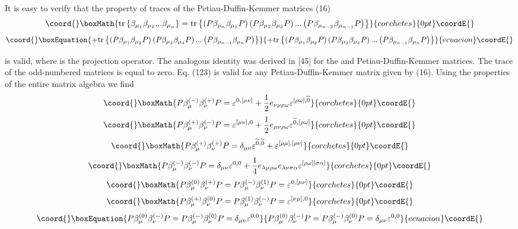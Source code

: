 \documentclass[a4paper,12pt]{article}
\begin{document}
It is easy to verify that the property of traces of the \coordHE{}
Petiau-Duffin-Kemmer matrices \myHighlight{$\beta _\mu ^{(\pm )}$}\coordHE{} (16)
\[\coord{}\boxMath{
\mbox{tr}\left\{ \beta _{\mu _1}\beta _{\mu _2}...\beta _{\mu
_n}\right\} = \mbox{tr}\left\{ \left( P\beta _{\mu _n}\beta _{\mu
_1}P\right) \left( P\beta _{\mu _2}\beta _{\mu _3}P\right)
...\left( P\beta _{\mu _{n-2}}\beta _{\mu _{n-1}}P\right) \right\}
}{corchetes}{0pt}\coordE{}\]
\begin{equation}\coord{}\boxEquation{
+\mbox{tr}\left\{ \left( P\beta _{\mu _1}\beta _{\mu _2}P\right)
\left( P\beta _{\mu _3}\beta _{\mu _4}P\right) ...\left( P\beta
_{\mu _{n-1}}\beta _{\mu _n}P\right) \right\}  \label{123}
}{
+\mbox{tr}\left\{ \left( P\beta _{\mu _1}\beta _{\mu _2}P\right)
\left( P\beta _{\mu _3}\beta _{\mu _4}P\right) ...\left( P\beta
_{\mu _{n-1}}\beta _{\mu _n}P\right) \right\}  }{ecuacion}\coordE{}\end{equation}

is valid, where \coordHE{} is the projection operator. The analogous identity was
derived in [45] for the \coordHE{} and \coordHE{}Petiau-Duffin-Kemmer matrices. The trace of the odd-numbered
matrices \myHighlight{$\beta _\mu ^{(\pm )}$}\coordHE{} is equal to zero. Eq. (123) is
valid for any Petiau-Duffin-Kemmer matrix given by (16). Using the
properties of the entire matrix algebra \coordHE{} we
find
\[\coord{}\boxMath{
P\beta _\mu ^{(-)}\beta _\nu ^{(+)}P=\varepsilon ^{0,[\mu \nu ]}+\frac
12e_{\nu \mu \rho \omega }\varepsilon ^{[\rho \omega ],\widetilde{0}}
}{corchetes}{0pt}\coordE{}\]
\[\coord{}\boxMath{
P\beta _\mu ^{(+)}\beta _\nu ^{(-)}P=\varepsilon ^{[\mu \nu ],0}+\frac
12e_{\mu \nu \rho \omega }\varepsilon ^{\widetilde{0},[\rho \omega ]}
}{corchetes}{0pt}\coordE{}\]
\[\coord{}\boxMath{
P\beta _\mu ^{(+)}\beta _\nu ^{(+)}P=\delta _{\mu \nu }\varepsilon
^{ \widetilde{0},\widetilde{0}}+\varepsilon ^{[\rho \mu ],[\rho
\nu ]}
}{corchetes}{0pt}\coordE{}\]
\[\coord{}\boxMath{
P\beta _\mu ^{(-)}\beta _\nu ^{(-)}P=\delta _{\mu \nu }\varepsilon
^{0,0}+\frac 14e_{\lambda \mu \rho \omega }e_{\lambda \nu \sigma \alpha
}\varepsilon ^{[\rho \omega ][\sigma \alpha ]}
}{corchetes}{0pt}\coordE{}\]
\[\coord{}\boxMath{
P\beta _\mu ^{(0)}\beta _\nu ^{(+)}P=P\beta _\mu ^{(-)}\beta _\nu
^{(1)}P=\varepsilon ^{0,[\mu \nu ]}
}{corchetes}{0pt}\coordE{}\]
\[\coord{}\boxMath{
P\beta _\mu ^{(+)}\beta _\nu ^{(0)}P=P\beta _\mu ^{(1)}\beta _\nu
^{(-)}P=\varepsilon ^{[\nu \mu ],0}
}{corchetes}{0pt}\coordE{}\]
\begin{equation}\coord{}\boxEquation{
P\beta _\mu ^{(0)}\beta _\nu ^{(-)}P=P\beta _\mu ^{(-)}\beta _\nu
^{(0)}P=\delta _{\mu \nu }\varepsilon ^{0,0}  \label{124}
}{
P\beta _\mu ^{(0)}\beta _\nu ^{(-)}P=P\beta _\mu ^{(-)}\beta _\nu
^{(0)}P=\delta _{\mu \nu }\varepsilon ^{0,0}  }{ecuacion}\coordE{}\end{equation}
\end{document}
